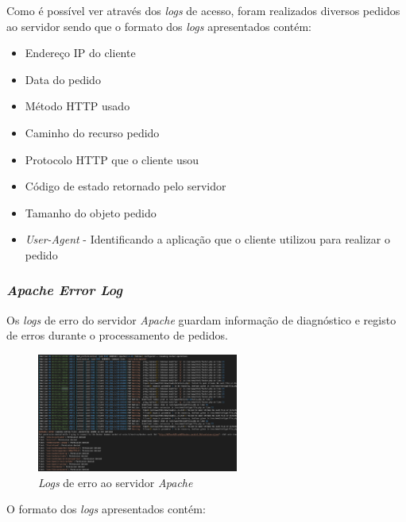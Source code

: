 \documentclass[10pt,english]{article}
\begin{document}
\par Como é possível ver através dos \textit{logs} de acesso, foram realizados diversos pedidos ao servidor sendo que o formato dos \textit{logs} apresentados contém:

\begin{itemize}
    \item Endereço IP do cliente
    \item Data do pedido
    \item Método HTTP usado
    \item Caminho do recurso pedido
    \item Protocolo HTTP que o cliente usou
    \item Código de estado retornado pelo servidor
    \item Tamanho do objeto pedido
    \item \textit{User-Agent} - Identificando a aplicação que o cliente utilizou para realizar o pedido
\end{itemize}

\subsubsection{\textit{Apache Error Log}}

\par Os \textit{logs} de erro do servidor \textit{Apache} guardam informação de diagnóstico e registo de erros durante o processamento de pedidos.

\begin{figure}[h]
    \centering
    \includegraphics[width=250]{images/errorlog.png}
    \caption{\textit{Logs} de erro ao servidor \textit{Apache}}
\end{figure}

\par O formato dos \textit{logs} apresentados contém:
\end{document}
